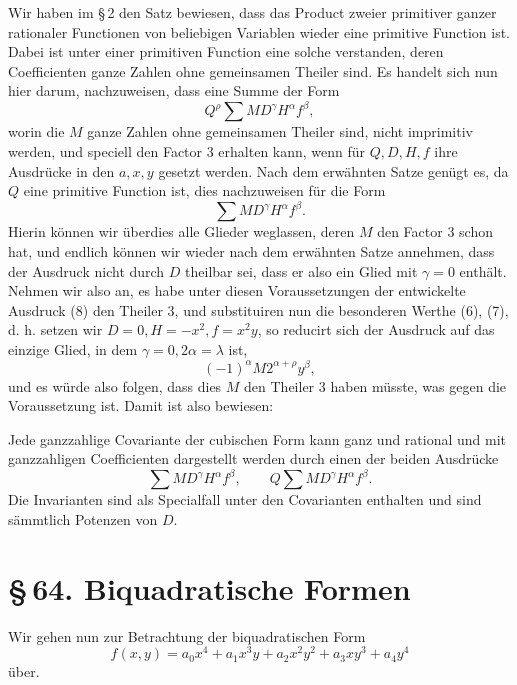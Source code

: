 \documentclass[11pt]{article}
\providecommand{\sect}[2]{\section*{\S\,#1. #2}}
\begin{document}
Wir haben im \S\,2 den Satz bewiesen, dass das Product zweier primitiver ganzer rationaler Functionen von beliebigen Variablen wieder eine primitive Function ist. Dabei ist unter einer primitiven Function eine solche verstanden, deren Coefficienten ganze Zahlen ohne gemeinsamen Theiler sind. Es handelt sich nun hier darum, nachzuweisen, dass eine Summe der Form
\[
 Q^\rho\sum MD^\gamma H^\alpha f^\beta,
\]
worin die $M$ ganze Zahlen ohne gemeinsamen Theiler sind, nicht imprimitiv werden, und speciell den Factor $3$ erhalten kann, wenn für $Q,D,H,f$ ihre Ausdrücke in den $a,x,y$ gesetzt werden. Nach dem erwähnten Satze genügt es, da $Q$ eine primitive Function ist, dies nachzuweisen für die Form
\begin{equation}
 \sum MD^\gamma H^\alpha f^\beta.
\tag{8}
\end{equation}
Hierin können wir überdies alle Glieder weglassen, deren $M$ den Factor $3$ schon hat, und endlich können wir wieder nach dem erwähnten Satze annehmen, dass der Ausdruck nicht durch $D$ theilbar sei, dass er also ein Glied mit $\gamma=0$ enthält. Nehmen wir also an, es habe unter diesen Voraussetzungen der entwickelte Ausdruck (8) den Theiler $3$, und substituiren nun die besonderen Werthe (6), (7), d. h. setzen wir $D=0,H=-x^2,f=x^2y$, so reducirt sich der Ausdruck auf das einzige Glied, in dem $\gamma=0,2\alpha=\lambda$ ist,
\[
 (-1)^\alpha M2^{\alpha+\rho}y^\beta,
\]
und es würde also folgen, dass dies $M$ den Theiler $3$ haben müsste, was gegen die Voraussetzung ist. Damit ist also bewiesen:

Jede ganzzahlige Covariante der cubischen Form kann ganz und rational und mit ganzzahligen Coefficienten dargestellt werden durch einen der beiden Ausdrücke
\[
 \sum MD^\gamma H^\alpha f^\beta,
 \qquad
 Q\sum MD^\gamma H^\alpha f^\beta.
\]
Die Invarianten sind als Specialfall unter den Covarianten enthalten und sind sämmtlich Potenzen von $D$.

\sect{64}{Biquadratische Formen}

Wir gehen nun zur Betrachtung der biquadratischen Form
\begin{equation}
 f(x,y)=a_0x^4+a_1x^3y+a_2x^2y^2+a_3xy^3+a_4y^4
\tag{1}
\end{equation}
über.
\end{document}
